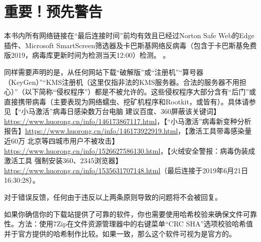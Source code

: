 \section{重要！预先警告}
\begin{window}
本书内所有网络链接在“最后连接时间”前均有效且已经过Norton Safe Web的Edge插件、Microsoft SmartScreen筛选器及卡巴斯基网络反病毒（包含于卡巴斯基免费版2019，病毒库更新时间为检测当天12:00）检测。 {}。\par 同样需要声明的是，从任何网站下载“破解版”或“注册机”“算号器（KeyGen）”“KMS注册机（这里仅指非法的KMS服务器。合法的服务器不用担心）”（以下简称“侵权程序”）都是不被允许的。这些侵权程序大部分含有“后门”或直接携带病毒（主要表现为网络蠕虫、挖矿机程序和Rootkit，或皆有）。具体请参见【“小马激活”病毒日感染数万台电脑 建议百度、360屏蔽该关键词】\url{https://www.huorong.cn/info/146173867117.html}，【“小马激活”病毒新变种分析报告】\url{https://www.huorong.cn/info/146173922919.html}，【激活工具带毒感染量近60万 北京等四城市用户不被攻击】\url{https://www.huorong.cn/info/1526627586130.html}，【火绒安全警报：病毒伪装成激活工具  强制安装360、2345浏览器】\url{https://www.huorong.cn/info/1535631707148.html}（最后连接于2019年6月21日16:30:28）。\end{window}\par
 对于错误反馈，任何由于违反以上两条原则导致的问题将不会被回复。\par 
 如果你确信你的下载站提供了可靠的软件，你也需要使用哈希校验来确保文件可靠性。方法：使用7Zip在文件资源管理器中的右键菜单“CRC SHA”选项校验哈希值并于官方提供的哈希制作比较。如果一致，那么这个软件可视为是官方的。 \par
